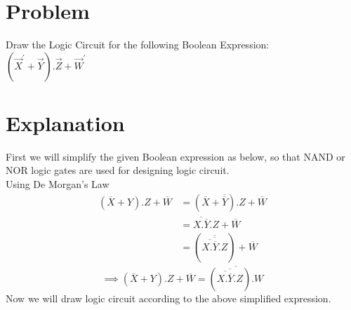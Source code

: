 \documentclass{article}
\begin{document}
\section{Problem}
Draw the Logic Circuit for the following Boolean Expression:\\
$\left(\vec{X}^{'}+\vec{Y}\right).\vec{Z}+\vec{W}^{'}$
\section{Explanation}
First we will simplify the given Boolean expression as below, so that NAND or NOR logic gates are used for designing logic circuit.\\
Using De Morgan's Law
\begin{equation}
\begin{split}
    \left(\overline{X}+Y\right).Z+\overline{W}&=\left(\overline{X}+\overline{\overline{Y}}\right).Z+\overline{W}\\
    &=\overline{X.\overline{Y}}.Z+\overline{W}\\
    &=\left(\overline{\overline{\overline{X.\overline{Y}}.Z}}\right)+\overline{W}
\end{split}
\end{equation}
\begin{equation}
    \implies\left(\overline{X}+Y\right).Z+\overline{W}=\overline{\left(\overline{\overline{X.\overline{Y}}.Z}\right).W}
\end{equation}
Now we will draw logic circuit according to the above simplified expression.
\end{document}
